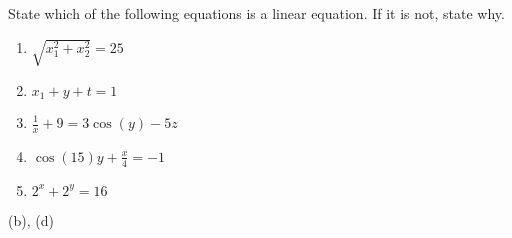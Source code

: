 {State which of the following equations is a linear equation. If it is not, state why.
\begin{enumerate}
\item		$\sqrt{x_1^2+x_2^2} = 25$
\item		$x_1 + y + t = 1$
\item		$\frac{1}{x} + 9 = 3\cos(y) - 5z$
\item		$\cos(15)y + \frac{x}{4} =-1$
\item		$2^x + 2^y = 16$
\end{enumerate}
}
{(b), (d)}